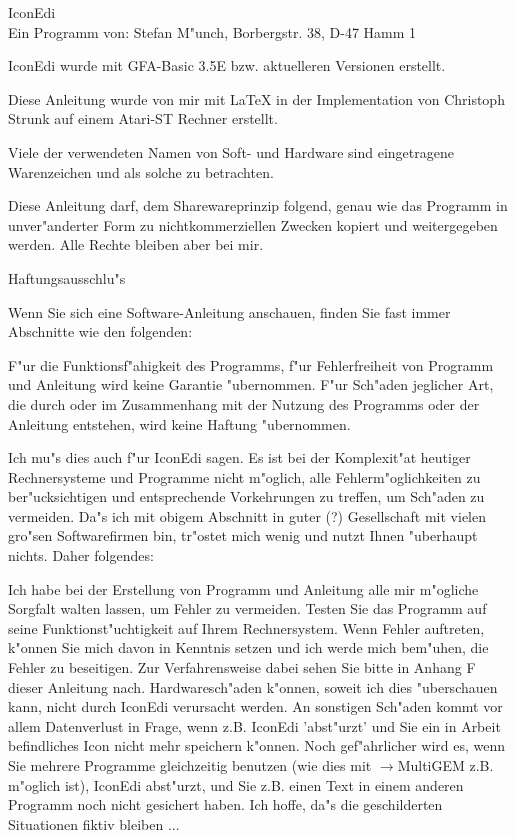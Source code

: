 %
\setcounter{page}{0}
\thispagestyle{plain}

{\LARGE IconEdi} \\

Ein Programm von: Stefan M"unch, Borbergstr. 38, D-47 Hamm 1

IconEdi wurde mit GFA-Basic 3.5E bzw. aktuelleren Versionen 
erstellt.

Diese Anleitung wurde von mir mit {\LaTeX} in der Implementation
von Christoph Strunk auf einem Atari-ST Rechner erstellt.

Viele der verwendeten Namen von Soft- und Hardware sind 
eingetragene Warenzeichen und als solche zu betrachten.

Diese Anleitung darf, dem Sharewareprinzip folgend, genau wie
das Programm in unver"anderter Form zu nichtkommerziellen 
Zwecken kopiert und weitergegeben werden. Alle Rechte bleiben 
aber bei mir.

\bigskip

{\Large Haftungsausschlu"s} 

Wenn Sie sich eine Software-Anleitung anschauen, finden Sie
fast immer Abschnitte wie den folgenden:

F"ur die Funktionsf"ahigkeit des Programms, f"ur Fehlerfreiheit von
Programm und Anleitung wird keine Garantie "ubernommen. F"ur Sch"aden 
jeglicher Art, die durch oder im Zusammenhang mit der Nutzung des
Programms oder der Anleitung entstehen, wird keine Haftung 
"ubernommen.

Ich mu"s dies auch f"ur IconEdi sagen. Es ist bei der Komplexit"at
heutiger Rechnersysteme und Programme nicht m"oglich, alle 
Fehlerm"oglichkeiten zu ber"ucksichtigen und entsprechende 
Vorkehrungen zu treffen, um Sch"aden zu vermeiden. Da"s ich mit
obigem Abschnitt in guter (?) Gesellschaft mit vielen gro"sen 
Softwarefirmen bin, tr"ostet mich wenig und nutzt Ihnen "uberhaupt
nichts. Daher folgendes:

Ich habe bei der Erstellung von Programm und Anleitung alle mir
m"ogliche Sorgfalt walten lassen, um Fehler zu vermeiden. Testen
Sie das Programm auf seine Funktionst"uchtigkeit auf Ihrem 
Rechnersystem. Wenn Fehler auftreten, k"onnen Sie mich davon
in Kenntnis setzen und ich werde mich bem"uhen, die Fehler zu 
beseitigen. Zur Verfahrensweise dabei sehen Sie bitte in Anhang
F dieser Anleitung nach. Hardwaresch"aden k"onnen, soweit ich dies
"uberschauen kann, nicht durch IconEdi verursacht werden. 
An sonstigen Sch"aden kommt vor allem Datenverlust in Frage,
wenn z.B. IconEdi 'abst"urzt' und Sie ein in Arbeit befindliches
Icon nicht mehr speichern k"onnen. Noch gef"ahrlicher wird es, wenn
Sie mehrere Programme gleichzeitig benutzen (wie dies mit 
$\to$MultiGEM z.B. m"oglich ist), IconEdi abst"urzt, und Sie z.B. 
einen Text in einem anderen Programm noch nicht gesichert haben.
Ich hoffe, da"s die geschilderten Situationen fiktiv bleiben ...


